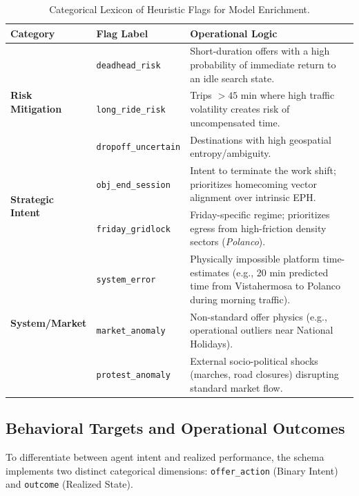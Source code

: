 \begin{table}[H]
    \centering
    \small
    \begin{tabularx}{\textwidth}{l l X}
        \toprule
        \textbf{Category} & \textbf{Flag Label} & \textbf{Operational Logic} \\
        \midrule
        \multirow{3}{*}{\textbf{Risk Mitigation}} 
        & \texttt{deadhead\_risk} & Short-duration offers with a high probability of immediate return to an idle search state. \\
        & \texttt{long\_ride\_risk} & Trips $>45$ min where high traffic volatility creates risk of uncompensated time. \\
        & \texttt{dropoff\_uncertain} & Destinations with high geospatial entropy/ambiguity. \\
        \midrule
        \multirow{2}{*}{\textbf{Strategic Intent}} 
        & \texttt{obj\_end\_session} & Intent to terminate the work shift; prioritizes homecoming vector alignment over intrinsic EPH. \\
        & \texttt{friday\_gridlock} & Friday-specific regime; prioritizes egress from high-friction density sectors (\textit{Polanco}). \\
        \midrule
        \multirow{3}{*}{\textbf{System/Market}} 
        & \texttt{system\_error} & Physically impossible platform time-estimates (e.g., 20 min predicted time from Vistahermosa to Polanco during morning traffic). \\
        & \texttt{market\_anomaly} & Non-standard offer physics (e.g., operational outliers near National Holidays). \\
        & \texttt{protest\_anomaly} & External socio-political shocks (marches, road closures) disrupting standard market flow. \\
        \bottomrule
    \end{tabularx}
    \caption{Categorical Lexicon of Heuristic Flags for Model Enrichment.}
    \label{tab:heuristic_flags}
\end{table}












\subsection{Behavioral Targets and Operational Outcomes}
To differentiate between agent intent and realized performance, the schema implements two distinct categorical dimensions: \texttt{offer\_action} (Binary Intent) and \texttt{outcome} (Realized State).

